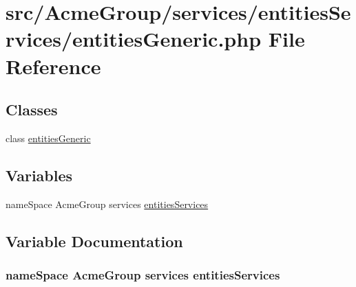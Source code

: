 \hypertarget{entities_generic_8php}{\section{src/\+Acme\+Group/services/entities\+Services/entities\+Generic.php File Reference}
\label{entities_generic_8php}
}
\subsection*{Classes}
\begin{DoxyCompactItemize}
\item 
class \hyperlink{classentities_generic}{entities\+Generic}
\end{DoxyCompactItemize}
\subsection*{Variables}
\begin{DoxyCompactItemize}
\item 
name\+Space Acme\+Group services \hyperlink{entities_generic_8php_a8b0ae0be8249aa3f7474b1d011c4b917}{entities\+Services}
\end{DoxyCompactItemize}


\subsection{Variable Documentation}
\hypertarget{entities_generic_8php_a8b0ae0be8249aa3f7474b1d011c4b917}{
\subsubsection[{entities\+Services}]{\setlength{\rightskip}{0pt plus 5cm}name\+Space Acme\+Group services entities\+Services}}\label{entities_generic_8php_a8b0ae0be8249aa3f7474b1d011c4b917}
